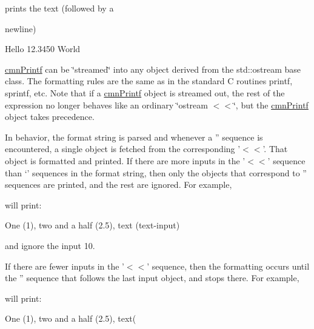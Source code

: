 prints the text (followed by a \par
 newline)

\begin{DoxyVerb}Hello 12.3450 World
\end{DoxyVerb}


\hyperlink{classcmn_printf}{cmn\-Printf} can be \char`\"{}streamed\char`\"{} into any object derived from the std\-::ostream base class. The formatting rules are the same as in the standard C routines printf, sprintf, etc. Note that if a \hyperlink{classcmn_printf}{cmn\-Printf} object is streamed out, the rest of the expression no longer behaves like an ordinary \char`\"{}ostream $<$$<$\char`\"{}, but the \hyperlink{classcmn_printf}{cmn\-Printf} object takes precedence.

In behavior, the format string is parsed and whenever a '' sequence is encountered, a single object is fetched from the corresponding '$<$$<$'. That object is formatted and printed. If there are more inputs in the '$<$$<$' sequence than `' sequences in the format string, then only the objects that correspond to '' sequences are printed, and the rest are ignored. For example,




will print\-:

\begin{DoxyVerb}One (1), two and a half (2.5), text (text-input)
\end{DoxyVerb}


and ignore the input 10.

If there are fewer inputs in the '$<$$<$' sequence, then the formatting occurs until the '' sequence that follows the last input object, and stops there. For example,




will print\-:

\begin{DoxyVerb}One (1), two and a half (2.5), text(
\end{DoxyVerb}


